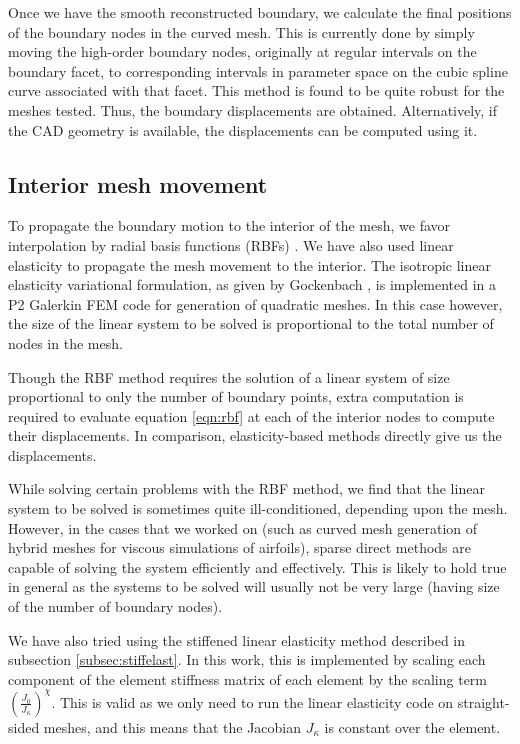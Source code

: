 Once we have the smooth reconstructed boundary, we calculate the final positions of the boundary nodes in the curved mesh. This is currently done by simply moving the high-order boundary nodes, originally at regular intervals on the boundary facet, to corresponding intervals in parameter space on the cubic spline curve associated with that facet. This method is found to be quite robust for the meshes tested. Thus, the boundary displacements are obtained. Alternatively, if the CAD geometry is available, the displacements can be computed using it.

\subsection{Interior mesh movement}

To propagate the boundary motion to the interior of the mesh, we favor interpolation by radial basis functions (RBFs) \cite{mm:rbf}. We have also used linear elasticity to propagate the mesh movement to the interior. The isotropic linear elasticity variational formulation, as given by Gockenbach \cite{gockenbach}, is implemented in a P2 Galerkin FEM code for generation of quadratic meshes. In this case however, the size of the linear system to be solved is proportional to the total number of nodes in the mesh.

Though the RBF method requires the solution of a linear system of size proportional to only the number of boundary points, extra computation is required to evaluate equation \eqref{eqn:rbf} at each of the interior nodes to compute their displacements. In comparison, elasticity-based methods directly give us the displacements. 

While solving certain problems with the RBF method, we find that the linear system to be solved is sometimes quite ill-conditioned, depending upon the mesh. However, in the cases that we worked on (such as curved mesh generation of hybrid meshes for viscous simulations of airfoils), sparse direct methods are capable of solving the system efficiently and effectively. This is likely to hold true in general as the systems to be solved will usually not be very large (having size of the number of boundary nodes).

We have also tried using the stiffened linear elasticity method described in subsection \ref{subsec:stiffelast}. In this work, this is implemented by scaling each component of the element stiffness matrix of each element by the scaling term $\left(\frac{J_0}{J_\kappa}\right)^\chi$. This is valid as we only need to run the linear elasticity code on straight-sided meshes, and this means that the Jacobian $J_\kappa$ is constant over the element.

